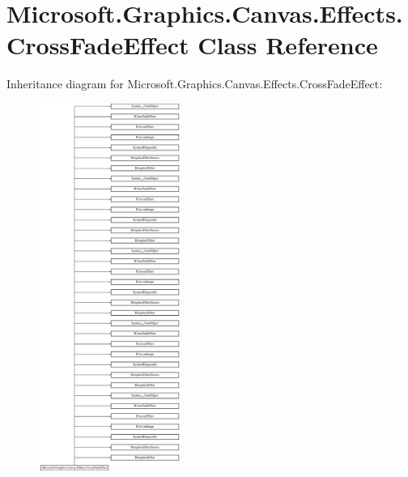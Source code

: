 \hypertarget{class_microsoft_1_1_graphics_1_1_canvas_1_1_effects_1_1_cross_fade_effect}{}\section{Microsoft.\+Graphics.\+Canvas.\+Effects.\+Cross\+Fade\+Effect Class Reference}
\label{class_microsoft_1_1_graphics_1_1_canvas_1_1_effects_1_1_cross_fade_effect}
Inheritance diagram for Microsoft.\+Graphics.\+Canvas.\+Effects.\+Cross\+Fade\+Effect\+:\begin{figure}[H]
\begin{center}
\leavevmode
\includegraphics[height=12.000000cm]{class_microsoft_1_1_graphics_1_1_canvas_1_1_effects_1_1_cross_fade_effect}
\end{center}
\end{figure}
